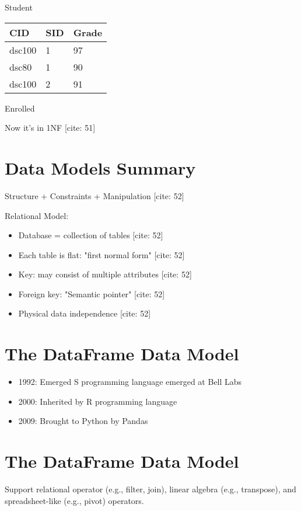 \documentclass{article}
\begin{document}
Student

\begin{tabular}{lll}
\hline
CID & SID & Grade \\
\hline
dsc100 & 1 & 97 \\
dsc80 & 1 & 90 \\
dsc100 & 2 & 91 \\
\hline
\end{tabular}

Enrolled

Now it's in 1NF [cite: 51]

\section*{Data Models Summary}

Structure + Constraints + Manipulation [cite: 52]

Relational Model:

\begin{itemize}
    \item Database = collection of tables [cite: 52]
    \item Each table is flat: "first normal form" [cite: 52]
    \item Key: may consist of multiple attributes [cite: 52]
    \item Foreign key: "Semantic pointer" [cite: 52]
    \item Physical data independence [cite: 52]
\end{itemize}

\section*{The DataFrame Data Model}

\begin{itemize}
    \item 1992: Emerged S programming language emerged at Bell Labs
    \item 2000: Inherited by R programming language
    \item 2009: Brought to Python by Pandas
\end{itemize}

\section*{The DataFrame Data Model}

Support relational operator (e.g., filter, join), linear algebra (e.g., transpose), and spreadsheet-like (e.g., pivot) operators.
\end{document}

